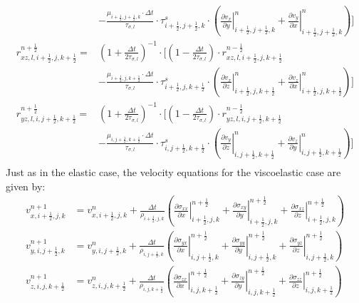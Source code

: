 \documentclass[pdftex,a4paper,parskip,listof=totoc,bibliography=totoc,onehalfspacing,12pt]{scrreprt}
\begin{document}
\begin{align*}
	& -\frac{\mu_{i+\frac{1}{2},j+\frac{1}{2},k}\cdot\Delta t}{\tau_{\sigma,l}}\cdot \tau^s_{i+\frac{1}{2},j+\frac{1}{2},k} \cdot \left( \left.\frac{\partial v_x}{\partial y}\right\rvert_{i+\frac{1}{2},j+\frac{1}{2},k}^{n} + \left.\frac{\partial v_y}{\partial x}\right\rvert_{i+\frac{1}{2},j+\frac{1}{2},k}^{n} \right)\Bigg]\\
	r_{xz,l,i+\frac{1}{2},j,k+\frac{1}{2}}^{n+\frac{1}{2}} =& \left( 1+ \frac{\Delta t}{2\tau_{\sigma,l}} \right)^{-1}\cdot \Bigg[\left( 1- \frac{\Delta t}{2\tau_{\sigma,l}}  \right) \cdot r_{xz,l,i+\frac{1}{2},j,k+\frac{1}{2}}^{n-\frac{1}{2}} \\ 
	& -\frac{\mu_{i+\frac{1}{2},j,k+\frac{1}{2}}\cdot\Delta t}{\tau_{\sigma,l}}\cdot \tau^s_{i+\frac{1}{2},j,k+\frac{1}{2}} \cdot \left( \left.\frac{\partial v_x}{\partial z}\right\rvert_{i+\frac{1}{2},j,k+\frac{1}{2}}^{n} + \left.\frac{\partial v_z}{\partial x}\right\rvert_{i+\frac{1}{2},j,k+\frac{1}{2}}^{n} \right)\Bigg]\\
	r_{yz,l,i,j+\frac{1}{2},k+\frac{1}{2}}^{n+\frac{1}{2}} =& \left( 1+ \frac{\Delta t}{2\tau_{\sigma,l}} \right)^{-1}\cdot \Bigg[\left( 1- \frac{\Delta t}{2\tau_{\sigma,l}}  \right) \cdot r_{yz,l,i,j+\frac{1}{2},k+\frac{1}{2}}^{n-\frac{1}{2}} \\ 
	& -\frac{\mu_{i,j+\frac{1}{2},k+\frac{1}{2}}\cdot\Delta t}{\tau_{\sigma,l}}\cdot \tau^s_{i,j+\frac{1}{2},k+\frac{1}{2}} \cdot \left( \left.\frac{\partial v_y}{\partial z}\right\rvert_{i,j+\frac{1}{2},k+\frac{1}{2}}^{n} + \left.\frac{\partial v_z}{\partial y}\right\rvert_{i,j+\frac{1}{2},k+\frac{1}{2}}^{n} \right)\Bigg] \\
\end{align*}
Just as in the elastic case, the velocity equations for the viscoelastic case are given by:
\begin{align*}
	v_{x,i+\frac{1}{2},j,k}^{n+1} &= v_{x,i+\frac{1}{2},j,k}^n + \frac{\Delta t}{\rho_{i+\frac{1}{2},j,k}}  \left( \left.\frac{\partial\sigma_{xx}}{\partial x}\right\rvert_{i+\frac{1}{2},j,k}^{n+\frac{1}{2}} + \left.\frac{\partial\sigma_{xy}}{\partial y}\right\rvert_{i+\frac{1}{2},j,k}^{n+\frac{1}{2}} + \left.\frac{\partial\sigma_{xz}}{\partial z}\right\rvert_{i+\frac{1}{2},j,k}^{n+\frac{1}{2}} \right)\\
	v_{y,i,j+\frac{1}{2},k}^{n+1} &= v_{y,i,j+\frac{1}{2},k}^n + \frac{\Delta t}{\rho_{i,j+\frac{1}{2},k}}  \left( \left.\frac{\partial\sigma_{yx}}{\partial x}\right\rvert_{i,j+\frac{1}{2},k}^{n+\frac{1}{2}} + \left.\frac{\partial\sigma_{yy}}{\partial y}\right\rvert_{i,j+\frac{1}{2},k}^{n+\frac{1}{2}} + \left.\frac{\partial\sigma_{yz}}{\partial z}\right\rvert_{i,j+\frac{1}{2},k}^{n+\frac{1}{2}} \right)\\
	v_{z,i,j,k+\frac{1}{2}}^{n+1} &= v_{z,i,j,k+\frac{1}{2}}^n + \frac{\Delta t}{\rho_{i,j,k+\frac{1}{2}}}  \left( \left.\frac{\partial\sigma_{zx}}{\partial x}\right\rvert_{i,j,k+\frac{1}{2}}^{n+\frac{1}{2}} + \left.\frac{\partial\sigma_{zy}}{\partial y}\right\rvert_{i,j,k+\frac{1}{2}}^{n+\frac{1}{2}} + \left.\frac{\partial\sigma_{zz}}{\partial z}\right\rvert_{i,j,k+\frac{1}{2}}^{n+\frac{1}{2}} \right)
\end{align*}
\end{document}
